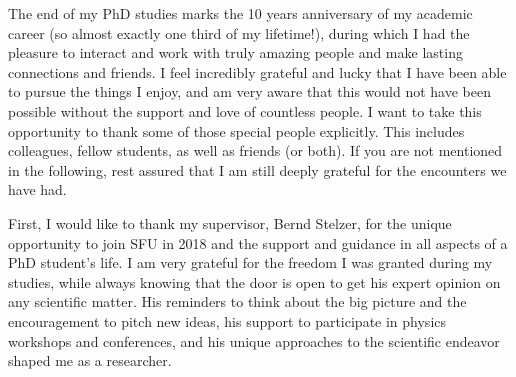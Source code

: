 The end of my PhD studies marks the 10 years anniversary of my academic career (so almost exactly one third of my lifetime!), during which I had the pleasure to interact and work with truly amazing people and make lasting connections and friends.
I feel incredibly grateful and lucky that I have been able to pursue the things I enjoy, and am very aware that this would not have been possible without the support and love of countless people. 
I want to take this opportunity to thank some of those special people explicitly.
This includes colleagues, fellow students, as well as friends (or both).
If you are not mentioned in the following, rest assured that I am still deeply grateful for the encounters we have had.

First, I would like to thank my supervisor, Bernd Stelzer, for the unique opportunity to join SFU in 2018 and the support and guidance in all aspects of a PhD student's life. 
I am very grateful for the freedom I was granted during my studies, while always knowing that the door is open to get his expert opinion on any scientific matter.
His reminders to think about the big picture and the encouragement to pitch new ideas, his support to participate in physics workshops and conferences, and his unique approaches to the scientific endeavor shaped me as a researcher. 

